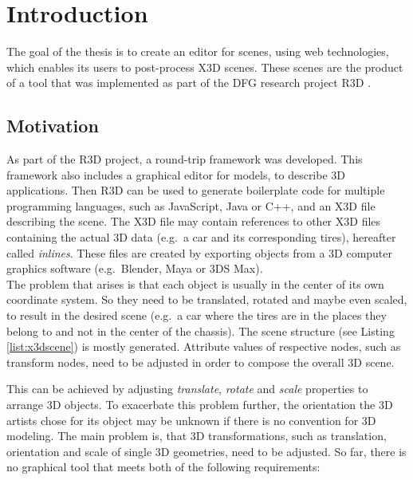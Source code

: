 
\section{Introduction}
\label{sec:Prelude}

The goal of the thesis is to create an editor for  scenes, using web technologies,
which enables its users to post-process \gls{X3D} scenes. These scenes are the
product of a tool that was implemented as part of the DFG research
project \gls{R3D} \cite{Jung:2015:SDA:2802768.2802837}.
\subsection{Motivation}\label{motivation}

As part of the \gls{R3D} project, a round-trip framework
was developed. This framework also includes a
graphical editor for  \cite{Lenk:2012:MID:2338714.2338742} models, to describe \gls{3D} applications. Then
\gls{R3D} can be used to generate boilerplate code for multiple programming
languages, such as JavaScript, Java or C++, and an \gls{X3D} file describing
the scene. The \gls{X3D} file may contain references to other \gls{X3D} files
containing the actual \gls{3D} data (e.g.~a car and its corresponding tires),
hereafter called \emph{inlines}. These files are created by exporting
objects from a \gls{3D} computer graphics software (e.g.~Blender,
Maya or 3DS Max).\\
The problem that arises is that each object is usually in the center of
its own coordinate system. So they need to be translated, rotated and
maybe even scaled, to result in the desired scene (e.g.~a car where the tires
are in the places they belong to and not in the center of the chassis).
The scene structure (see Listing \ref{list:x3dscene}) is mostly generated. Attribute values of respective nodes,
such as transform nodes, need to be adjusted in order to compose the
overall \gls{3D} scene.


This can be achieved by adjusting \emph{translate}, \emph{rotate} and
\emph{scale} properties to arrange \gls{3D} objects. To exacerbate this problem
further, the orientation the \gls{3D} artists chose for its object may be unknown if
there is no convention for \gls{3D} modeling. The main problem is, that \gls{3D} transformations, such as translation,
orientation and scale of single \gls{3D} geometries, need to be adjusted. So far,
there is no graphical tool that meets both of the following requirements:


